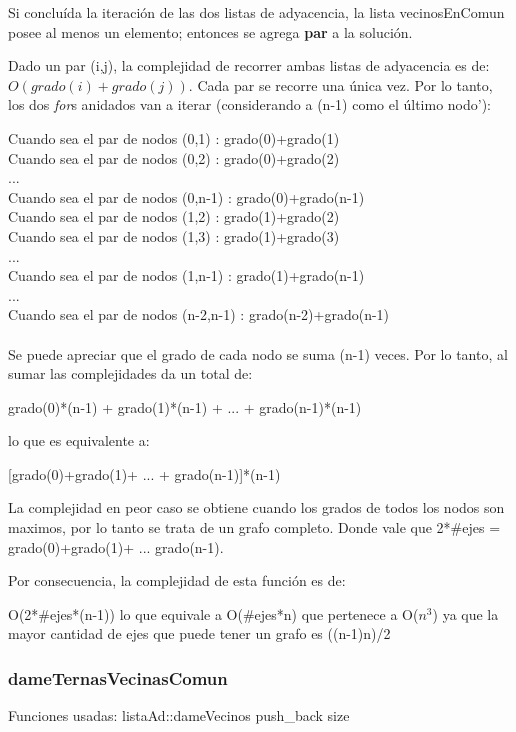 Si conclu\'ida la iteraci\'on de las dos listas de adyacencia, la lista vecinosEnComun posee al menos un elemento; entonces se agrega \textbf{par} a la soluci\'on.


Dado un par (i,j), la complejidad de recorrer ambas listas de adyacencia es de: $O(grado(i)+grado(j))$.
Cada par se recorre una \'unica vez. Por lo tanto, los dos \emph{for}s anidados van a iterar (considerando a (n-1) como el \'ultimo nodo'):

Cuando sea el par de nodos (0,1) : grado(0)+grado(1) \\
Cuando sea el par de nodos (0,2) : grado(0)+grado(2) \\
...\\
Cuando sea el par de nodos (0,n-1) : grado(0)+grado(n-1)\\
Cuando sea el par de nodos (1,2) : grado(1)+grado(2)\\
Cuando sea el par de nodos (1,3) : grado(1)+grado(3)\\
...\\
Cuando sea el par de nodos (1,n-1) : grado(1)+grado(n-1)\\
...\\
Cuando sea el par de nodos (n-2,n-1) : grado(n-2)+grado(n-1)\\
\\
Se puede apreciar que el grado de cada nodo se suma (n-1) veces. Por lo tanto, al sumar las complejidades da un total de:

grado(0)*(n-1) + grado(1)*(n-1) + ... + grado(n-1)*(n-1)

lo que es equivalente a:

[grado(0)+grado(1)+ ... + grado(n-1)]*(n-1)

La complejidad en peor caso se obtiene cuando los grados de todos los nodos son maximos, por lo tanto se trata de un grafo completo.
Donde vale que 2*\#ejes = grado(0)+grado(1)+ ... grado(n-1).

Por consecuencia, la complejidad de esta funci\'on es de:

O(2*\#ejes*(n-1)) lo que equivale a O(\#ejes*n) que pertenece a O($n^3$) ya que la mayor cantidad de ejes que puede tener un grafo es ((n-1)n)/2


\subsubsection{dameTernasVecinasComun}\label{vec2}

Funciones usadas:
listaAd::dameVecinos
push_back
size

